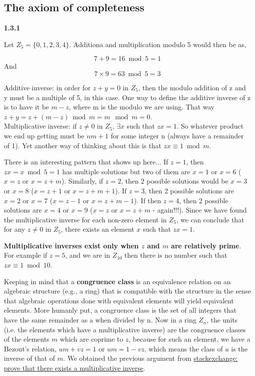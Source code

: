 \subsection{The axiom of completeness}

\textbf{1.3.1}

Let $Z_5 = \{0, 1, 2, 3, 4\}$.
Additiona and multiplication modulo 5 would then be as,

$$
7+9 = 16 \bmod 5 = 1
$$
And
$$
7\times 9 = 63 \bmod 5 = 3
$$

Additive inverse: in order for $z+y = 0$ in $Z_5$, then the modulo addition of z and y must be a multiple of 5, in this case.
One way to define the additive inverse of z is to have it be $m-z$, where m is the modulo we are using.
That way $z + y = z + (m-z) \bmod m = m \mod m = 0$.
\\

Multiplicative inverse: if $z \neq 0$ in $Z_5$, $\exists x$ such that $zx = 1$.
So whatever product we end up getting must be $nm + 1$ for some integer n (always have a remainder of 1).
Yet another way of thinking about this is that $zx \equiv 1 \bmod m$.

There is an interesting pattern that shows up here...
If $z=1$, then $zx = x \bmod 5 = 1$ has multiple solutions but two of them are $x=1$ or $x=6$ ($x=z$ or $x=z+m$).
Similarly, if $z=2$, then 2 possible solutions would be $x=3$ or $x=8$ ($x=z+1$ or $x=z+m+1$).
If $z=3$, then 2 possible solutions are $x=2$ or $x=7$ ($x=z-1$ or $x=z+m-1$).
If then $z=4$, then 2 possible solutions are $x=4$ or $x=9$ ($x=z$ or $x=z+m$ - again!!!).
Since we have found the multiplicative inverse for each non-zero element in $Z_5$, we can conclude
that for any $z \neq 0$ in $Z_5$, there exists an element $x$ such that $zx = 1$.

\textbf{Multiplicative inverses exist only when $z$ and $m$ are relatively prime}.
For example if $z=5$, and we are in $Z_{10}$ then there is no number such that $zx \equiv 1 \bmod 10$.

Keeping in mind that a \textbf{congruence class} is an equivalence relation on an algebraic structure (e.g., a ring)
that is compatible with the structure in the sense that algebraic operations done with equivalent elements will yield equivalent elements.
More humanly put, a congruence class is the set of all integers that have the same remainder as a when divided by n.
Now in a ring $Z_n$, the units (i.e. the elements which have a multiplicative inverse) are the
congruence classes of the elements $m$ which are coprime to $z$, because for such an element, we have a
Bezout's relation, $um + vz = 1$ or $um = 1 - vz$, which means the class of $u$ is the inverse of that of $m$.
We obtained the previous argument from
\href{https://math.stackexchange.com/questions/2650336/for-z-5-0-1-4-and-z-in-z-n-prove-that-there-exists-a-multiplicative-i}{stackexchange: prove that there exists a multiplicative inverse}.
\\~\\


